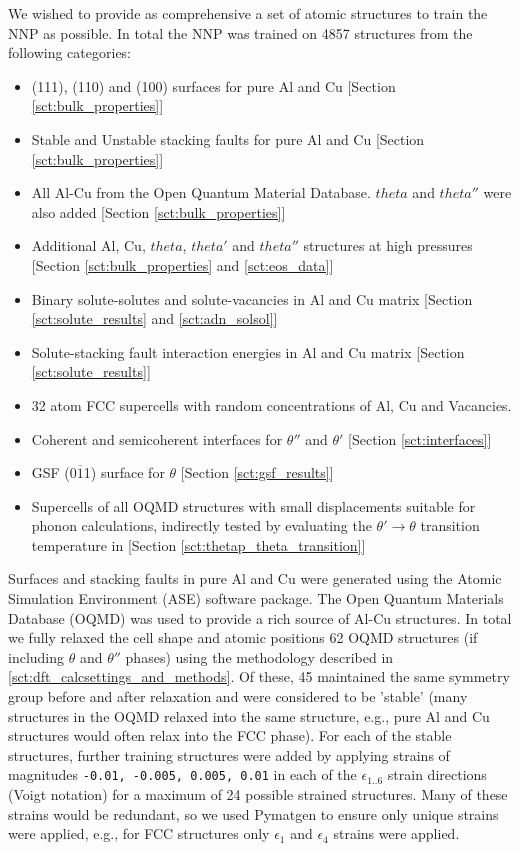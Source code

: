 \documentclass{article}
\begin{document}
We wished to provide as comprehensive a set of atomic structures to train the NNP as possible.
In total the NNP was trained on 4857 structures from the following categories:
\begin{itemize}
    \item (111), (110) and (100) surfaces for pure Al and Cu [Section \ref{sct:bulk_properties}]
    \item Stable and Unstable stacking faults for pure Al and Cu [Section \ref{sct:bulk_properties}]
    \item All Al-Cu from the Open Quantum Material Database\cite{Kirklin2015}. $theta$ and $theta''$ were also added  [Section \ref{sct:bulk_properties}]
    \item Additional Al, Cu, $theta$, $theta'$ and $theta''$ structures at high pressures [Section \ref{sct:bulk_properties} and \ref{sct:eos_data}]
    \item Binary solute-solutes and solute-vacancies in Al and Cu matrix  [Section \ref{sct:solute_results} and \ref{sct:adn_solsol}]
    \item Solute-stacking fault interaction energies in Al and Cu matrix  [Section \ref{sct:solute_results}]
    \item 32 atom FCC supercells with random concentrations of Al, Cu and Vacancies. 
    \item Coherent and semicoherent interfaces for $\theta''$  and $\theta'$ [Section \ref{sct:interfaces}]
    \item GSF (0$\overline{1}$1) surface for $\theta$ [Section \ref{sct:gsf_results}]
    \item Supercells of all OQMD structures with small displacements suitable for phonon calculations,
          indirectly tested by evaluating the $\theta' \rightarrow \theta$ transition temperature in
          [Section \ref{sct:thetap_theta_transition}]
\end{itemize}

Surfaces and stacking faults in pure Al and Cu were generated using the Atomic Simulation Environment (ASE) software package.
The Open Quantum Materials Database (OQMD)\cite{Kirklin2015} was used to provide a rich source of Al-Cu structures.
In total we fully relaxed the cell shape and atomic positions 62 OQMD structures (if including $\theta$ and $\theta''$ phases) using the methodology described in \ref{sct:dft_calcsettings_and_methods}.
Of these, 45 maintained the same symmetry group before and after relaxation and were considered to be 'stable' (many structures in the OQMD relaxed into the same structure, e.g., pure Al and Cu structures would often relax into the FCC phase).
For each of the stable structures, further training structures were added by applying strains of magnitudes \texttt{-0.01, -0.005, 0.005, 0.01} in each of the $\epsilon_{1..6}$ strain directions (Voigt notation) for a maximum of 24 possible strained structures.
Many of these strains would be redundant, so we used Pymatgen\cite{Ong2013} to ensure only unique strains were applied, e.g., for FCC structures only $\epsilon_1$ and $\epsilon_4$
strains were applied.
\end{document}
